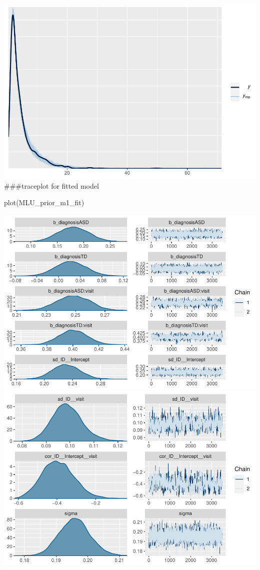 \documentclass[
]{article}
\newenvironment{Shaded}{\begin{snugshade}}{\end{snugshade}}
\newcommand{\FunctionTok}[1]{\textcolor[rgb]{0.00,0.00,0.00}{#1}}
\newcommand{\NormalTok}[1]{#1}
\begin{document}
\includegraphics{assignment_1_final_files/figure-latex/unnamed-chunk-11-1.pdf}
\#\#\#traceplot for fitted model

\begin{Shaded}
\begin{Highlighting}[]
\FunctionTok{plot}\NormalTok{(MLU\_prior\_m1\_fit)}
\end{Highlighting}
\end{Shaded}

\includegraphics{assignment_1_final_files/figure-latex/unnamed-chunk-12-1.pdf}
\includegraphics{assignment_1_final_files/figure-latex/unnamed-chunk-12-2.pdf}
\end{document}
